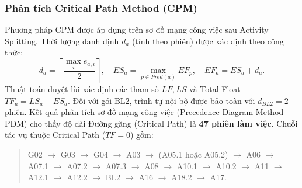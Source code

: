 \subsubsection{Phân tích Critical Path Method (CPM)}
Phương pháp CPM được áp dụng trên sơ đồ mạng công việc sau Activity Splitting. Thời lượng danh định $d_a$ (tính theo phiên) được xác định theo công thức:
\[
d_a=\left\lceil\frac{\max_i e_{a,i}}{2}\right\rceil,
\quad ES_a=\max_{p\in Pred(a)}EF_p,\quad EF_a=ES_a+d_a.
\]
Thuật toán duyệt lùi xác định các tham số $LF, LS$ và Total Float $TF_a = LS_a - ES_a$. Đối với gói BL2, trình tự nội bộ được bảo toàn với $d_{BL2}=2$ phiên.
Kết quả phân tích sơ đồ mạng công việc (Precedence Diagram Method - PDM) cho thấy độ dài Đường găng (Critical Path) là \textbf{47 phiên làm việc}. Chuỗi tác vụ thuộc Critical Path ($TF=0$) gồm:
\begin{quote}\small
G02 $\to$ G03 $\to$ G04 $\to$ A03 $\to$ (A05.1 hoặc A05.2) $\to$ A06 $\to$ A07.1 $\to$ A07.2 $\to$ A07.3 $\to$ A08 $\to$ A10.1 $\to$ A10.2 $\to$ A11 $\to$ A12.1 $\to$ A12.2 $\to$ BL2 $\to$ A16 $\to$ A18.2 $\to$ A17.
\end{quote}
